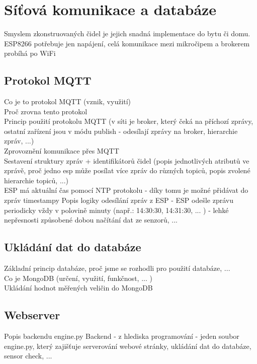 \chapter{Síťová komunikace a databáze} \label{chap:methods}

Smyslem zkonstruovaných čidel je jejich snadná implementace do bytu či domu. \\
ESP8266 potřebuje jen napájení, celá komunikace mezi mikročipem a brokerem probíhá po WiFi \\

\section{Protokol MQTT} \label{sec:protocol_mqtt}

Co je to protokol MQTT (vznik, využití) \\
Proč zrovna tento protokol \\
Princip použití protokolu MQTT (v síti je broker, který čeká na příchozí zprávy, ostatní zařízení jsou v módu publish - odesílají zprávy na broker, hierarchie zpráv, ...) \\
Zprovoznění komunikace přes MQTT \\ 
Sestavení struktury zpráv + identifikátorů čidel (popis jednotlivých atributů ve zprávě, proč jedno esp může posílat více zpráv do různých topiců, popis zvolené hierarchie topiců, ...) \\
ESP má aktuální čas pomocí NTP protokolu - díky tomu je možné přidávat do zpráv timestampy
Popis logiky odesílání zpráv z ESP - ESP odešle zprávu periodicky vždy v polovině minuty (např.: 14:30:30, 14:31:30, ... ) - lehké nepřesnosti způsobené dobou načítání dat ze senzorů, ... \\

\section{Ukládání dat do databáze} \label{sec:example_xor}

Základní princip databáze, proč jsme se rozhodli pro použití databáze,  ... \\
Co je MongoDB (určení, využití, funkčnost, ... ) \\
Ukládání hodnot měřených veličin do MongoDB \\

\section{Webserver} \label{sec:example_xor}

Popis backendu engine.py
Backend - z hlediska programování - jeden soubor engine.py, který zajišťuje serverování webové stránky, ukládání dat do databáze, sensor check, ... \\
